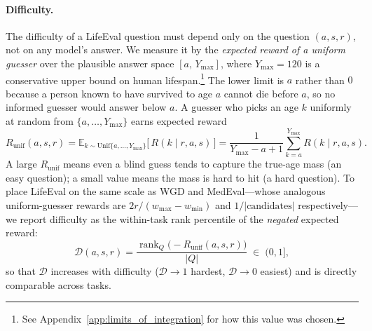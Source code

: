 \paragraph{Difficulty.}
The difficulty of a LifeEval question must depend only on the question $(a,s,r)$, not on any model's answer. We measure it by the \emph{expected reward of a uniform guesser} over the plausible answer space $[a,\,Y_{\max}]$, where $Y_{\max} = 120$ is a conservative upper bound on human lifespan.\footnote{See Appendix~\ref{app:limits_of_integration} for how this value was chosen.} The lower limit is $a$ rather than $0$ because a person known to have survived to age $a$ cannot die before $a$, so no informed guesser would answer below $a$. A guesser who picks an age $k$ uniformly at random from $\{a,\dots,Y_{\max}\}$ earns expected reward
\begin{equation}
    R_{\text{unif}}(a,s,r)
    = \mathbb{E}_{k \sim \mathrm{Unif}\{a,\dots,Y_{\max}\}}\!\bigl[\,R(k \mid r,a,s)\,\bigr]
    = \frac{1}{Y_{\max}-a+1}\sum_{k=a}^{Y_{\max}} R(k \mid r,a,s).
    \label{eq:le_expected_reward}
\end{equation}
A large $R_{\text{unif}}$ means even a blind guess tends to capture the true-age mass (an easy question); a small value means the mass is hard to hit (a hard question). To place LifeEval on the same scale as WGD and MedEval---whose analogous uniform-guesser rewards are $2r/(w_{\max}-w_{\min})$ and $1/|\text{candidates}|$ respectively---we report difficulty as the within-task rank percentile of the \emph{negated} expected reward:
\begin{equation}
    \mathcal{D}(a,s,r)
    = \frac{\operatorname{rank}_{Q}\!\bigl(-R_{\text{unif}}(a,s,r)\bigr)}{|Q|}
    \;\in\; (0,1],
    \label{eq:le_difficulty}
\end{equation}
so that $\mathcal{D}$ increases with difficulty ($\mathcal{D}\to 1$ hardest, $\mathcal{D}\to 0$ easiest) and is directly comparable across tasks.
